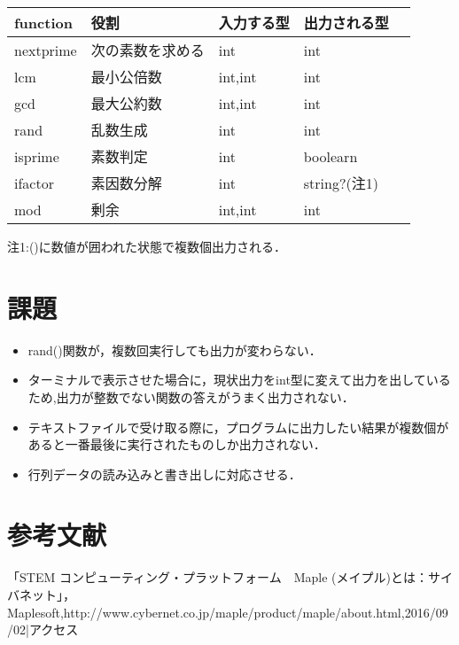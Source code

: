 \documentclass[10pt,a4j,twocolumn]{jsarticle}
\begin{document}
\begin{table}[htbp]\begin{center}
\caption{}
\begin{tabular}{lllll}
\hline
function  &役割  &入力する型  &出力される型  \\ \hline
nextprime  &次の素数を求める  &int  &int  \\
lcm  &最小公倍数  &int,int  &int  \\
gcd  &最大公約数  &int,int  &int  \\
rand  &乱数生成  &int  &int  \\
isprime  &素数判定  &int  &boolearn  \\
ifactor  &素因数分解  &int  &string?(注1)  \\
mod  &剰余  &int,int  &int  \\
\hline
\end{tabular}
\label{default}
\end{center}\end{table}

注1:()に数値が囲われた状態で複数個出力される．

\section{課題}\begin{itemize}
\item rand()関数が，複数回実行しても出力が変わらない．
\item ターミナルで表示させた場合に，現状出力をint型に変えて出力を出しているため,出力が整数でない関数の答えがうまく出力されない．
\item テキストファイルで受け取る際に，プログラムに出力したい結果が複数個があると一番最後に実行されたものしか出力されない．
\item 行列データの読み込みと書き出しに対応させる．
\end{itemize}
\section{参考文献}
\begin{thebibliography}{1}
「STEM コンピューティング・プラットフォーム　Maple (メイプル)とは：サイバネット」，Maplesoft,http://www.cybernet.co.jp/maple/product/maple/about.html,2016/09/02|アクセス
\end{thebibliography}
\end{document}
